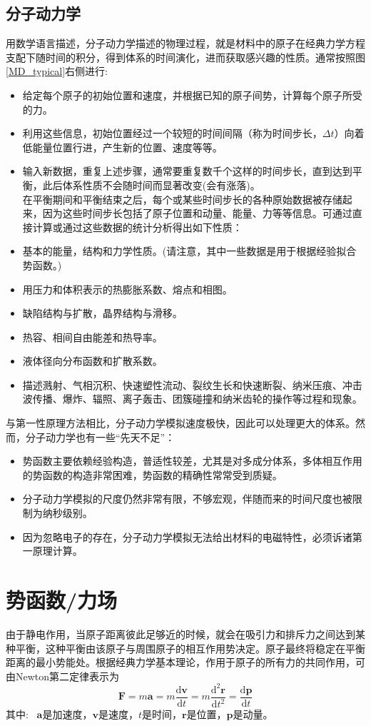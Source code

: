 \subsection{分子动力学}
用数学语言描述，分子动力学描述的物理过程，就是材料中的原子在经典力学方程支配下随时间的积分，得到体系的时间演化，进而获取感兴趣的性质。通常按照图\ref{MD_typical}右侧进行:~
\begin{itemize}
	\item 给定每个原子的初始位置和速度，并根据已知的原子间势，计算每个原子所受的力。
	\item 利用这些信息，初始位置经过一个较短的时间间隔（称为时间步长，$\Delta t$）向着低能量位置行进，产生新的位置、速度等等。
	\item 输入新数据，重复上述步骤，通常要重复数千个这样的时间步长，直到达到平衡，此后体系性质不会随时间而显著改变(会有涨落)。\\
在平衡期间和平衡结束之后，每个或某些时间步长的各种原始数据被存储起来，因为这些时间步长包括了原子位置和动量、能量、力等等信息。可通过直接计算或通过这些数据的统计分析得出如下性质：
	\item 基本的能量，结构和力学性质。(请注意，其中一些数据是用于根据经验拟合势函数。)
	\item 用压力和体积表示的热膨胀系数、熔点和相图。
	\item 缺陷结构与扩散，晶界结构与滑移。
	\item 热容、相间自由能差和热导率。
	\item 液体径向分布函数和扩散系数。
	\item 描述溅射、气相沉积、快速塑性流动、裂纹生长和快速断裂、纳米压痕、冲击波传播、爆炸、辐照、离子轰击、团簇碰撞和纳米齿轮的操作等过程和现象。
\end{itemize}
与第一性原理方法相比，分子动力学模拟速度极快，因此可以处理更大的体系。然而，分子动力学也有一些“先天不足”：
\begin{itemize}
	\item	势函数主要依赖经验构造，普适性较差，尤其是对多成分体系，多体相互作用的势函数的构造非常困难，势函数的精确性常常受到质疑。
	\item 分子动力学模拟的尺度仍然非常有限，不够宏观，伴随而来的时间尺度也被限制为纳秒级别。
	\item 因为忽略电子的存在，分子动力学模拟无法给出材料的电磁特性，必须诉诸第一原理计算。
\end{itemize}

\section{势函数/力场}
由于静电作用，当原子距离彼此足够近的时候，就会在吸引力和排斥力之间达到某种平衡，这种平衡由该原子与周围原子的相互作用势决定。原子最终将稳定在平衡距离的最小势能处。根据经典力学基本理论，作用于原子的所有力的共同作用，可由\textrm{Newton}第二定律表示为
\begin{equation}
	\mathbf{F}=m\mathbf{a}=m\dfrac{\mathrm{d}\mathbf{v}}{\mathrm{d}t}=m\dfrac{\mathrm{d}^2\mathbf{r}}{\mathrm{d}t^2}=\dfrac{\mathrm{d}\mathbf{p}}{\mathrm{d}t}
	\label{eq:Newton_2}
\end{equation}
其中:~
$\mathbf{a}$是加速度，$\mathbf{v}$是速度，$t$是时间，$\mathbf{r}$是位置，$\mathbf{p}$是动量。

